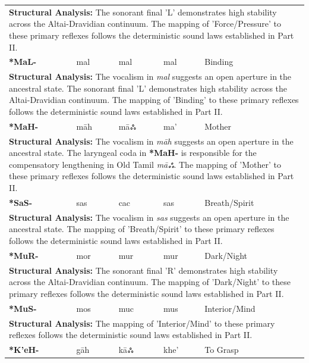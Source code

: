 \begin{longtable}{p{} p{} p{} p{} p{}}
\multicolumn{5}{p{\textwidth}}{\small \textbf{Structural Analysis:} The sonorant final 'L' demonstrates high stability across the Altai-Dravidian continuum. The mapping of 'Force/Pressure' to these primary reflexes follows the deterministic sound laws established in Part II.} \\ \addlinespace[15pt] 
\textbf{*MaL-} & mal & mal & mal & Binding \\ 
\multicolumn{5}{p{\textwidth}}{\small \textbf{Structural Analysis:} The vocalism in \textit{mal} suggests an open aperture in the ancestral state. The sonorant final 'L' demonstrates high stability across the Altai-Dravidian continuum. The mapping of 'Binding' to these primary reflexes follows the deterministic sound laws established in Part II.} \\ \addlinespace[15pt] 
\textbf{*MaH-} & māh & māஃ & ma' & Mother \\ 
\multicolumn{5}{p{\textwidth}}{\small \textbf{Structural Analysis:} The vocalism in \textit{māh} suggests an open aperture in the ancestral state. The laryngeal coda in \textbf{*MaH-} is responsible for the compensatory lengthening in Old Tamil \textit{māஃ}. The mapping of 'Mother' to these primary reflexes follows the deterministic sound laws established in Part II.} \\ \addlinespace[15pt] 
\textbf{*SaS-} & sas & cac & sas & Breath/Spirit \\ 
\multicolumn{5}{p{\textwidth}}{\small \textbf{Structural Analysis:} The vocalism in \textit{sas} suggests an open aperture in the ancestral state. The mapping of 'Breath/Spirit' to these primary reflexes follows the deterministic sound laws established in Part II.} \\ \addlinespace[15pt] 
\textbf{*MuR-} & mor & mur & mur & Dark/Night \\ 
\multicolumn{5}{p{\textwidth}}{\small \textbf{Structural Analysis:} The sonorant final 'R' demonstrates high stability across the Altai-Dravidian continuum. The mapping of 'Dark/Night' to these primary reflexes follows the deterministic sound laws established in Part II.} \\ \addlinespace[15pt] 
\textbf{*MuS-} & mos & muc & mus & Interior/Mind \\ 
\multicolumn{5}{p{\textwidth}}{\small \textbf{Structural Analysis:}  The mapping of 'Interior/Mind' to these primary reflexes follows the deterministic sound laws established in Part II.} \\ \addlinespace[15pt] 
\textbf{*K'eH-} & gāh & kāஃ & khe' & To Grasp \\ 

\end{longtable}
